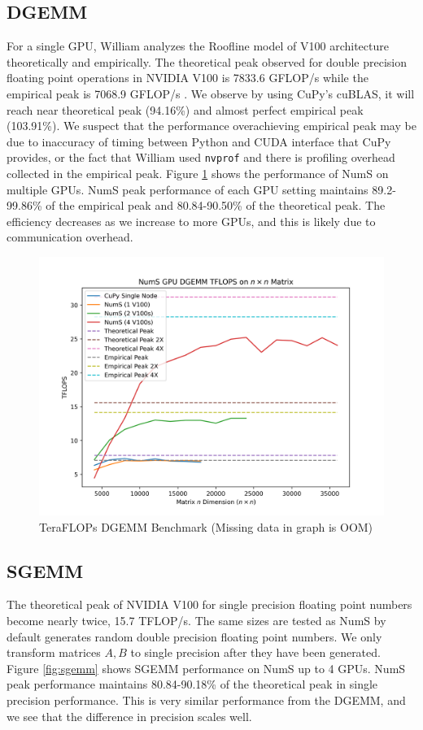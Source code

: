 \documentclass{article}
\begin{document}
\subsection{DGEMM}
For a single GPU, William analyzes the Roofline model of V100 architecture theoretically and empirically. The theoretical peak observed for double precision floating point operations in NVIDIA V100 is 7833.6 GFLOP/s while the empirical peak is 7068.9 GFLOP/s \cite{roofline}. We observe by using CuPy's cuBLAS, it will reach near theoretical peak (94.16\%) and almost perfect empirical peak (103.91\%). We suspect that the performance overachieving empirical peak may be due to inaccuracy of timing between Python and CUDA interface that CuPy provides, or the fact that William used \verb|nvprof| and there is profiling overhead collected in the empirical peak. Figure \ref{fig:dgemm} shows the performance of NumS on multiple GPUs. NumS peak performance of each GPU setting maintains 89.2-99.86\% of the empirical peak and 80.84-90.50\% of the theoretical peak. The efficiency decreases as we increase to more GPUs, and this is likely due to communication overhead.

\begin{figure}
  \centerline{\includegraphics[width=5in]{figures/NumS_GPU_TFLOPS_DGEMM.png}}
  \caption{TeraFLOPs DGEMM Benchmark (Missing data in graph is OOM)}
  \label{fig:dgemm}
\end{figure}

\subsection{SGEMM}
The theoretical peak of NVIDIA V100 for single precision floating point numbers become nearly twice, 15.7 TFLOP/s. The same sizes are tested as NumS by default generates random double precision floating point numbers. We only transform matrices $A, B$ to single precision after they have been generated. Figure \ref{fig:sgemm} shows SGEMM performance on NumS up to 4 GPUs. NumS peak performance maintains 80.84-90.18\% of the theoretical peak in single precision performance. This is very similar performance from the DGEMM, and we see that the difference in precision scales well.
\end{document}

